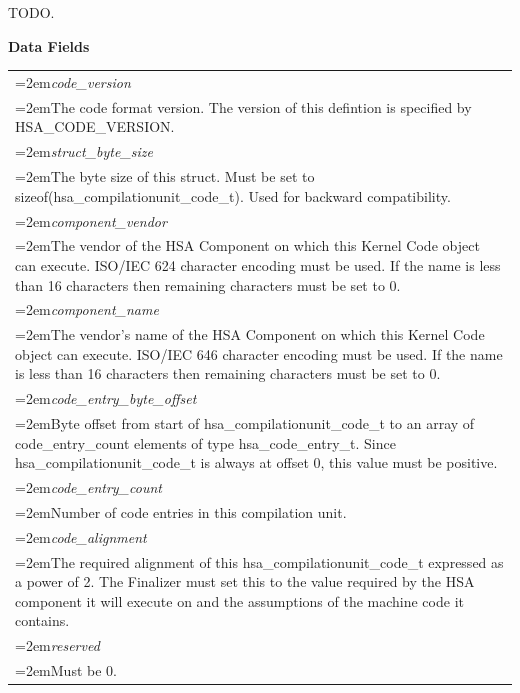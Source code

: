 \documentclass{book}
\newcommand{\hsaarg}[1]{\textit{#1}}
\begin{document}
\begin{appendices}
\begin{tcolorbox}[breakable,nobeforeafter,arc=0mm,colframe=white,colback=lightgray,left=0mm]
\end{tcolorbox}
TODO.

\noindent\textbf{Data Fields}\\[-5mm]
\begin{longtable}{@{}>{\hangindent=2em}p{\textwidth}}
\hsaarg{code\_version}\\\hspace{2em}The code format version. The version of this defintion is specified by HSA\_CODE\_VERSION.\\[2mm]
\hsaarg{struct\_byte\_size}\\\hspace{2em}The byte size of this struct. Must be set to sizeof(hsa\_compilationunit\_code\_t). Used for backward compatibility.\\[2mm]
\hsaarg{component\_vendor}\\\hspace{2em}The vendor of the HSA Component on which this Kernel Code object can execute. ISO/IEC 624 character encoding must be used. If the name is less than 16 characters then remaining characters must be set to 0.\\[2mm]
\hsaarg{component\_name}\\\hspace{2em}The vendor's name of the HSA Component on which this Kernel Code object can execute. ISO/IEC 646 character encoding must be used. If the name is less than 16 characters then remaining characters must be set to 0.\\[2mm]
\hsaarg{code\_entry\_byte\_offset}\\\hspace{2em}Byte offset from start of hsa\_compilationunit\_code\_t to an array of code\_entry\_count elements of type hsa\_code\_entry\_t. Since hsa\_compilationunit\_code\_t is always at offset 0, this value must be positive.\\[2mm]
\hsaarg{code\_entry\_count}\\\hspace{2em}Number of code entries in this compilation unit.\\[2mm]
\hsaarg{code\_alignment}\\\hspace{2em}The required alignment of this hsa\_compilationunit\_code\_t expressed as a power of 2. The Finalizer must set this to the value required by the HSA component it will execute on and the assumptions of the machine code it contains.\\[2mm]
\hsaarg{reserved}\\\hspace{2em}Must be 0.\\[2mm]

\end{longtable}
\end{appendices}
\end{document}
